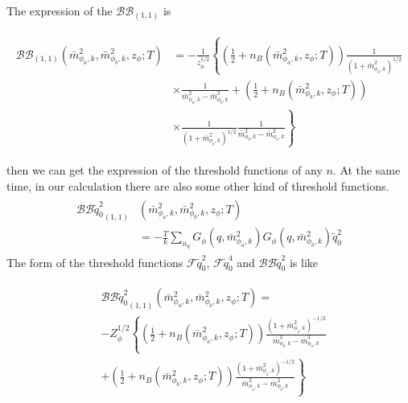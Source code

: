 \documentclass[%
reprint,
superscriptaddress,
showpacs,preprintnumbers,
 amsmath,amssymb,
 aps,
prd,
]{revtex4-1}
\begin{document}
The expression of the $\mathcal{BB}_{(1,1)}$ is 
\begin{widetext}
\begin{align}
\begin{split}
\mathcal{BB}_{(1,1)}(\bar{m}^{2}_{\phi_a,k},\bar{m}^{2}_{\phi_b,k},z_\phi;T)&=-\frac{1}{z^{1/2}_{\phi}}\left\{ \left( 
\frac{1}{2}+n_B(\bar{m}^{2}_{\phi_a,k},z_\phi;T) \right)\frac{1}{(1+\bar{m}^{2}_{\phi_a,k})^{1/2}} \right. \\
&\left.\times \frac{1}{\bar{m}^{2}_{\phi_a,k}-\bar{m}^{2}_{\phi_b,k}}+\left( \frac{1}{2}+n_B(\bar{m}^{2}_{\phi_b,k},z_\phi;T) 
\right)\right. \\
&\left.\times \frac{1}{(1+\bar{m}^{2}_{\phi_b,k})^{1/2}}\frac{1}{\bar{m}^{2}_{\phi_b,k}-\bar{m}^{2}_{\phi_a,k}}\right\}
\end{split}
\end{align} 
\end{widetext}
then we can get the expression of the threshold functions of any $n$.
At the same time, in our calculation there are also some other kind of threshold functions.
\begin{align}
\begin{split}
{\mathcal{BB}\tilde{q}_0^2}_{(1,1)}&(\bar{m}^{2}_{\phi_a,k},\bar{m}^{2}_{\phi_b,k},z_\phi;T)\\
&=-\frac{T}{k}\sum_{n_q}G_\phi(q,\bar{m}^{2}_{\phi_a,k})G_\phi(q,\bar{m}^{2}_{\phi_b,k})\tilde{q}_0^2
\end{split}
\end{align}
 The form of the threshold functions 
$\mathcal{F}\tilde{q}_0^2$,  $\mathcal{F}\tilde{q}_0^4$ and $\mathcal{BB}\tilde{q}_0^2$ is like



\begin{align}
\begin{split}
&{\mathcal{BB}\tilde{q}_0^2}_{(1,1)}(\bar{m}^{2}_{\phi_a,k},\bar{m}^{2}_{\phi_b,k},z_\phi;T)=\\
&-Z_\phi^{1/2}\left\{ \left( 
\frac{1}{2}+n_B(\bar{m}^{2}_{\phi_a,k},z_\phi;T) \right)\frac{(1+\bar{m}^{2}_{\phi_a,k})^{-1/2}}{\bar{m}^{2}_{\phi_b,k}-
\bar{m}^{2}_{\phi_a,k}}\right.\\
&\left.+\left( \frac{1}{2}+n_B(\bar{m}^{2}_{\phi_b,k},z_\phi;T) \right)\frac{(1+\bar{m}^{2}_{\phi_a,k})^{-1/2}}
{\bar{m}^{2}_{\phi_a,k}-\bar{m}^{2}_{\phi_b,k}}\right\}
\end{split}
\end{align} 
\end{document}
